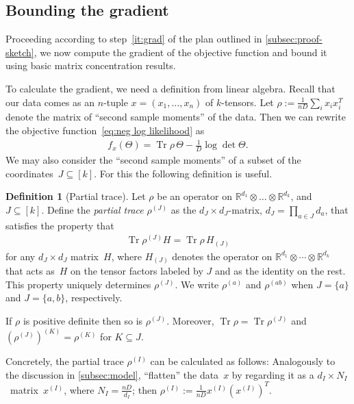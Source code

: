 \documentclass[aos]{imsart}
\theoremstyle{definition}
\newtheorem*{definition}{Definition}
\numberwithin{equation}{section}
\DeclareMathOperator{\tr}{Tr}
\newcommand{\R}{{\mathbb{R}}}
\newcommand{\ot}{\otimes}
\begin{document}
\subsection{Bounding the gradient}
Proceeding according to step~\ref{it:grad} of the plan outlined in \cref{subsec:proof-sketch}, we now compute the gradient of the objective function and bound it using basic matrix concentration results.

To calculate the gradient, we need a definition from linear algebra.
Recall that our data comes as an $n$-tuple $x=(x_1,\dots,x_n)$ of $k$-tensors. %
Let $\rho := \frac1{nD}\sum_i x_i x_i^T$ denote the matrix of ``second sample moments'' of the data.
Then we can rewrite the objective function~\eqref{eq:neg log likelihood} as
\begin{align}\label{eq:obj via rho}
  f_x(\Theta) = \tr \rho \, \Theta - \frac1D \log \det \Theta.
\end{align}
We may also consider the ``second sample moments'' of a subset of the coordinates~$J \subseteq [k]$.
For this the following definition is useful.

\begin{definition}[Partial trace]\label{definition:partial-trace}
Let $\rho$ be an operator on $\R^{d_1} \ot \dots \ot \R^{d_k}$, and~$J \subseteq [k]$.
Define the \emph{partial trace} $\rho^{(J)}$ as the $d_J \times d_J$-matrix, $d_J = \prod_{a\in J} d_a$, that satisfies the property that
\begin{align}\label{eq:partial trace duality}
  \tr \rho^{(J)} H
= \tr \rho \, H_{(J)}
\end{align}
for any $d_J\times d_J$ matrix~$H$, where $H_{(J)}$ denotes the operator on $\R^{d_1} \ot \cdots \ot \R^{d_k}$ that acts as~$H$ on the tensor factors labeled by $J$ and as the identity on the rest.
This property uniquely determines $\rho^{(J)}$.
We write $\rho^{(a)}$ and $\rho^{(ab)}$ when $J=\{a\}$ and $J=\{a,b\}$, respectively.


If $\rho$ is positive definite then so is $\rho^{(J)}$.
Moreover, $\tr \rho = \tr \rho^{(J)}$ and $(\rho^{(J)})^{(K)} = \rho^{(K)}$ for $K \subseteq J$.
\end{definition}

Concretely, the partial trace $\rho^{(I)}$ can be calculated as follows:
Analogously to the discussion in \cref{subsec:model}, ``flatten'' the data~$x$ by regarding it as a $d_I \times N_I$~matrix~$x^{(I)}$, where $N_I = \frac{nD}{d_I}$;
then $\rho^{(I)} := \frac1{nD} x^{(I)} (x^{(I)})^T$.
\end{document}

